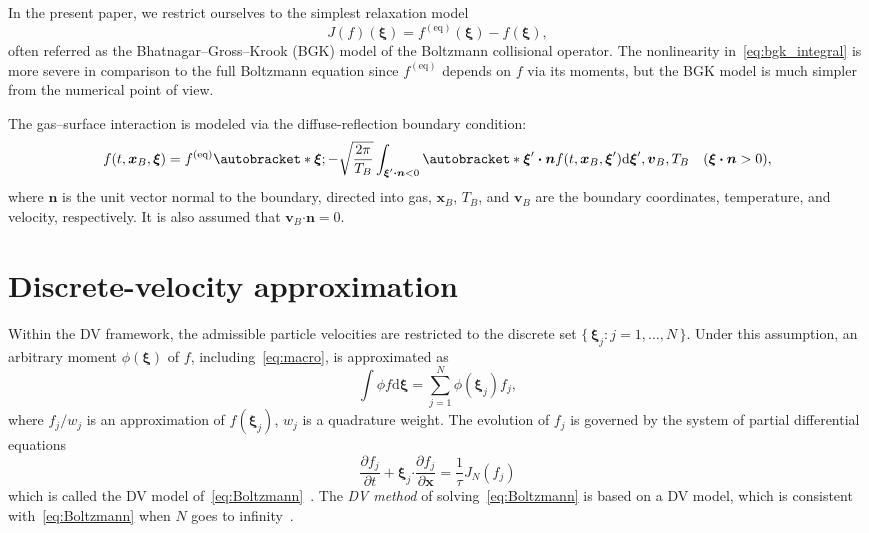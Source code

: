 \documentclass{elsarticle} %
\newcommand{\dd}{\mathrm{d}}
\newcommand{\pder}[2][]{\frac{\partial#1}{\partial#2}}
\newcommand{\Set}[2]{\{\,{#1}:{#2}\,\}}
\DeclarePairedDelimiter\autobracket()       %
\newcommand{\br}[1]{\autobracket*{#1}}
\newcommand{\dxi}{\dd{\boldsymbol{\xi}}}
\newcommand{\bxi}{\boldsymbol{\xi}}
\newcommand{\bv}{\boldsymbol{v}}
\newcommand{\bn}{\boldsymbol{n}}
\newcommand{\bdot}{\boldsymbol{\cdot}}
\newcommand{\bx}{\boldsymbol{x}}
\newcommand{\equil}[1]{#1^\mathrm{(eq)}}
\begin{document}
In the present paper, we restrict ourselves to the simplest relaxation model~\cite{Krook1954, Welander1954}
\begin{equation}\label{eq:bgk_integral}
    J(f)(\bxi) = \equil{f}(\bxi) - f(\bxi),
\end{equation}
often referred as the Bhatnagar--Gross--Krook (BGK) model of the Boltzmann collisional operator.
The nonlinearity in~\eqref{eq:bgk_integral} is more severe in comparison to the full Boltzmann equation
since \(\equil{f}\) depends on \(f\) via its moments,
but the BGK model is much simpler from the numerical point of view.

The gas--surface interaction is modeled via the diffuse-reflection boundary condition:
\begin{equation}\label{eq:diffuse}
    f(t,\bx_B,\bxi) = \equil{f} \br{ \bxi;
        -\sqrt\frac{2\pi}{T_B} \int_{\bxi'\bdot\bn<0} \br{ \bxi'\bdot\bn } f(t,\bx_B,\bxi')\dxi', \bv_B, T_B
    } \quad (\bxi\bdot\bn>0),
\end{equation}
where \(\bn\) is the unit vector normal to the boundary, directed into gas,
\(\bx_B\), \(T_B\), and \(\bv_B\) are the boundary coordinates, temperature, and velocity, respectively.
It is also assumed that \(\bv_B\bdot\bn = 0\).

\section{Discrete-velocity approximation}\label{sec:dv}

Within the DV framework, the admissible particle velocities
are restricted to the discrete set \(\Set{\bxi_j}{j=1,\dots,N}\).
Under this assumption, an arbitrary moment \(\phi(\bxi)\) of \(f\), including~\eqref{eq:macro},
is approximated as
\begin{equation}\label{eq:cubature}
    \int \phi f\dxi = \sum_{j=1}^{N} \phi(\bxi_j) f_j,
\end{equation}
where \(f_j/w_j\) is an approximation of \(f(\bxi_j)\), \(w_j\) is a quadrature weight.
The evolution of \(f_j\) is governed by the system of partial differential equations
\begin{equation}\label{eq:dvm}
    \pder[f_j]{t} + \bxi_j\bdot\pder[f_j]{\bx} = \frac{1}{\tau} J_N(f_j)
\end{equation}
which is called the DV model of~\eqref{eq:Boltzmann}~\cite{Cabannes1980}.
The \emph{DV method} of solving~\eqref{eq:Boltzmann} is based on a DV model,
which is consistent with~\eqref{eq:Boltzmann} when \(N\) goes to infinity~\cite{Aristov2001}.
\end{document}
